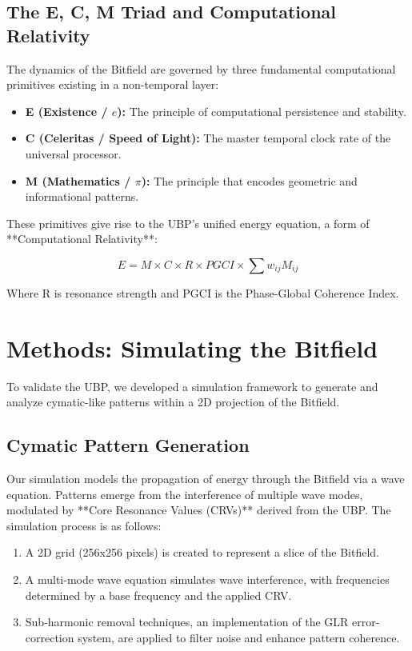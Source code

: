 \documentclass[12pt]{article}
\begin{document}
\subsection{The E, C, M Triad and Computational Relativity}
The dynamics of the Bitfield are governed by three fundamental computational primitives existing in a non-temporal layer:

\begin{itemize}
    \item \textbf{E (Existence / $e$):} The principle of computational persistence and stability.
    \item \textbf{C (Celeritas / Speed of Light):} The master temporal clock rate of the universal processor.
    \item \textbf{M (Mathematics / $\pi$):} The principle that encodes geometric and informational patterns.
\end{itemize}

These primitives give rise to the UBP's unified energy equation, a form of **Computational Relativity**:

\begin{equation}
    E = M \times C \times R \times PGCI \times \sum w_{ij} M_{ij}
\end{equation}

Where R is resonance strength and PGCI is the Phase-Global Coherence Index.

\section{Methods: Simulating the Bitfield}
To validate the UBP, we developed a simulation framework to generate and analyze cymatic-like patterns within a 2D projection of the Bitfield. 

\subsection{Cymatic Pattern Generation}
Our simulation models the propagation of energy through the Bitfield via a wave equation. Patterns emerge from the interference of multiple wave modes, modulated by **Core Resonance Values (CRVs)** derived from the UBP. The simulation process is as follows:

\begin{enumerate}
    \item A 2D grid (256x256 pixels) is created to represent a slice of the Bitfield.
    \item A multi-mode wave equation simulates wave interference, with frequencies determined by a base frequency and the applied CRV.
    \item Sub-harmonic removal techniques, an implementation of the GLR error-correction system, are applied to filter noise and enhance pattern coherence.
\end{enumerate}
\end{document}
